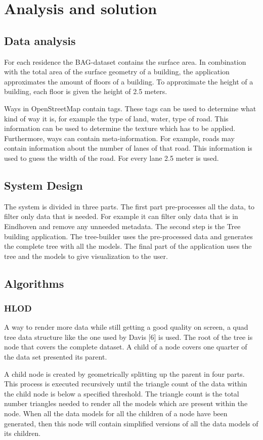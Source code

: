 \chapter{Analysis and solution}
\section{Data analysis}
For each residence the BAG-dataset contains the surface area. In combination with the total area of the surface geometry of a building, the application approximates the amount of floors of a building. To approximate the height of a building, each floor is given the height of 2.5 meters.

Ways in OpenStreetMap contain tags. These tags can be used to determine what kind of way it is, for example the type of land, water, type of road. This information can be used to determine the texture which has to be applied. Furthermore, ways can contain meta-information.  For example, roads may contain information about the number of lanes of that road. This information is used to guess the width of the road. For every lane 2.5 meter is used.

\section{System Design}
The system is divided in three parts. The first part pre-processes all the data, to filter only data that is needed. For example it can filter only data that is in Eindhoven and remove any unneeded metadata. The second step is the Tree building application. The tree-builder uses the pre-processed data and generates the complete tree with all the models. The final part of the application uses the tree and the models to give visualization to the user.

\section{Algorithms}
\subsection{HLOD}
A way to render more data while still getting a good quality on screen, a quad tree data structure like the one used by Davis [6] is used. The root of the tree is node that covers the complete dataset. A child of a node covers one quarter of the data set presented its parent.

A child node is created by geometrically splitting up the parent in four parts. This process is executed recursively until the triangle count of the data within the child node is below a specified threshold. The triangle count is the total number triangles needed to render all the models which are present within the node. When all the data models for all the children of a node have been generated, then this node will contain simplified versions of all the data models of its children.

